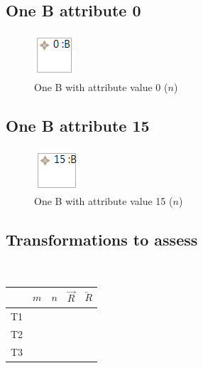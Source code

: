 \documentclass{article}
\newcommand{\cmark}{\ding{51}}%
\begin{document}
\subsection{One B attribute 0}
\label{sec:oneBatt0}

\begin{figure}[ht]
    \centering
    \includegraphics[scale=0.45]{printscreens/inst-oneBatt0.png}
    \caption{One B with attribute value 0 ($n$)}
    \label{fig:oneBatt0}
\end{figure}

\subsection{One B attribute 15}
\label{sec:oneBatt15}

\begin{figure}[ht]
    \centering
    \includegraphics[scale=0.45]{printscreens/inst-oneBatt15.png}
    \caption{One B with attribute value 15 ($n$)}
    \label{fig:oneBatt15}
\end{figure}



\pagebreak

\subsection{Transformations to assess}
~\\
\begin{center}
\begin{tabular}{| c | c | c | c | c | }
  \hline                        
   & $m$ & $n$ & $\overrightarrow{R}$ & $\overleftarrow{R}$ \\
  \hline 
  T1 & \nameref{sec:oneA} & \nameref{sec:oneBatt0} & \cmark & \\
  \hline
  T2 & \nameref{sec:noAs} & \nameref{sec:oneBatt15} &  & \cmark\\
  \hline
  T3 & \nameref{sec:oneA} & \nameref{sec:oneBatt15} & \cmark & \\
  \hline
\end{tabular}
\end{center}
~\\
\end{document}
